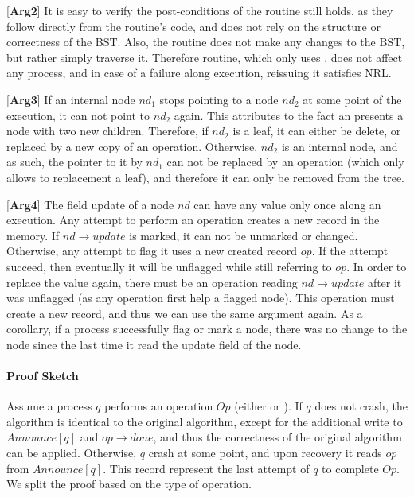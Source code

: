 \newcommand{\argSearch}{arg2}
[\textbf{Arg2}] It is easy to verify the post-conditions of the  routine still holds, as they follow directly from the routine's code, and does not rely on the structure or correctness of the BST. Also, the  routine does not make any changes to the BST, but rather simply traverse it. Therefore  routine, which only uses , does not affect any process, and in case of a failure along  execution, reissuing it satisfies NRL.

\newcommand{\argNodeRef}{arg3}
[\textbf{Arg3}] If an internal node $nd_1$ stops pointing to a node $nd_2$ at some point of the execution, it can not point to $nd_2$ again. This attributes to the fact an  presents a node with two new children. Therefore, if $nd_2$ is a leaf, it can either be delete, or replaced by a new copy of an  operation. Otherwise, $nd_2$ is an internal node, and as such, the pointer to it by $nd_1$ can not be replaced by an  operation (which only allows to replacement a leaf), and therefore it can only be removed from the tree.

\newcommand{\argNodeUpdate}{arg4}
[\textbf{Arg4}] The field update of a node $nd$ can have any value only once along an execution. Any attempt to perform an operation creates a new record in the memory. If $nd\rightarrow update$ is marked, it can not be unmarked or changed. Otherwise, any attempt to flag it uses a new created record $op$. If the attempt succeed, then eventually it will be unflagged while still referring to $op$. In order to replace the value again, there must be an operation reading $nd\rightarrow update$ after it was unflagged (as any operation first help a flagged node). This operation must create a new record, and thus we can use the same argument again. As a corollary, if a process successfully flag or mark a node, there was no change to the node since the last time it read the update field of the node.

\paragraph{Proof Sketch}
Assume a process $q$ performs an operation $Op$ (either  or ). If $q$ does not crash, the algorithm is identical to the original algorithm, except for the additional write to $Announce[q]$ and $op\rightarrow done$, and thus the correctness of the original algorithm can be applied. Otherwise, $q$ crash at some point, and upon recovery it reads $op$ from $Announce[q]$. This record represent the last attempt of $q$ to complete $Op$. We split the proof based on the type of operation.

